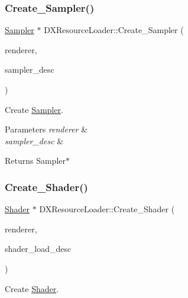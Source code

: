 \subsubsection{\texorpdfstring{Create\+\_\+\+Sampler()}{Create\_Sampler()}}
{\footnotesize\ttfamily \hyperlink{classSampler}{Sampler} $\ast$ D\+X\+Resource\+Loader\+::\+Create\+\_\+\+Sampler (\begin{DoxyParamCaption}\item[{\hyperlink{classDXRenderer}{D\+X\+Renderer} $\ast$}]{renderer,  }\item[{const \hyperlink{structSamplerDesc}{Sampler\+Desc} \&}]{sampler\+\_\+desc }\end{DoxyParamCaption})\hspace{0.3cm}{\ttfamily [static]}}



Create \hyperlink{classSampler}{Sampler}. 


\begin{DoxyParams}{Parameters}
{\em renderer} & \\
\hline
{\em sampler\+\_\+desc} & \\
\hline
\end{DoxyParams}
\begin{DoxyReturn}{Returns}
Sampler$\ast$ 
\end{DoxyReturn}
\mbox{\label{classDXResourceLoader_afc2a341f6271142b090fe1b51502882c}} 
\subsubsection{\texorpdfstring{Create\+\_\+\+Shader()}{Create\_Shader()}}
{\footnotesize\ttfamily \hyperlink{classShader}{Shader} $\ast$ D\+X\+Resource\+Loader\+::\+Create\+\_\+\+Shader (\begin{DoxyParamCaption}\item[{\hyperlink{classDXRenderer}{D\+X\+Renderer} $\ast$}]{renderer,  }\item[{const \hyperlink{structShaderLoadDesc}{Shader\+Load\+Desc} \&}]{shader\+\_\+load\+\_\+desc }\end{DoxyParamCaption})\hspace{0.3cm}{\ttfamily [static]}}



Create \hyperlink{classShader}{Shader}. 


